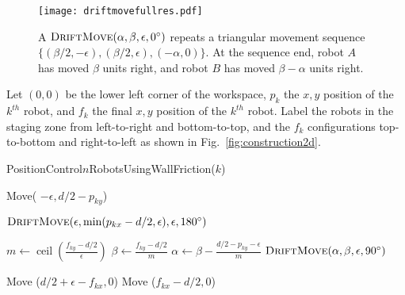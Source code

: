 \begin{figure}
\begin{center}
	\texttt{[image: driftmovefullres.pdf]}
\end{center}
\vspace{-1em}
\caption{\label{fig:driftmove}
A  $\text{\sc DriftMove}(\alpha, \beta, \epsilon,0^\circ)$ repeats a triangular movement sequence $\{ (\beta/2,-\epsilon),(\beta/2,\epsilon),(-\alpha,0)\}$. At the sequence end, robot $A$ has moved $\beta$ units right, and robot $B$ has moved $\beta-\alpha$ units right.}
\vspace{-1em}
\end{figure}

Let $(0,0)$ be the lower left corner of the workspace, $p_k$ the $x,y$ position of the $k^{th}$ robot, and $f_k$ the final $x,y$ position of the $k^{th}$ robot. Label the robots in the staging zone from left-to-right and bottom-to-top, and the $f_k$ configurations top-to-bottom and right-to-left as shown in Fig.~\ref{fig:construction2d}.

\begin{algorithm}
\caption{PositionControl$n$RobotsUsingWallFriction($k$)}\label{alg:PosControlNRobots}
\begin{algorithmic}[1]
\State Move( $-\epsilon, d/2-p_{ky}$) %


\State $\text{\sc DriftMove}(\epsilon, \min(p_{kx} - d/2,\epsilon), \epsilon,180^\circ)$    %
\EndWhile

\State $m \gets \operatorname{ceil}(\frac{f_{ky}-d/2}{\epsilon})$
\State $\beta \gets \frac{f_{ky}-d/2}{m}$
\State $\alpha \gets \beta - \frac{d/2 - p_{ky}-\epsilon}{m}$
\State $\text{\sc DriftMove}(\alpha, \beta, \epsilon,90^\circ)$    %
\EndFor

\State Move ($d/2+\epsilon-f_{kx}, 0$)  %
\State Move ($f_{kx}-d/2, 0$)  

\end{algorithmic}
\end{algorithm}


